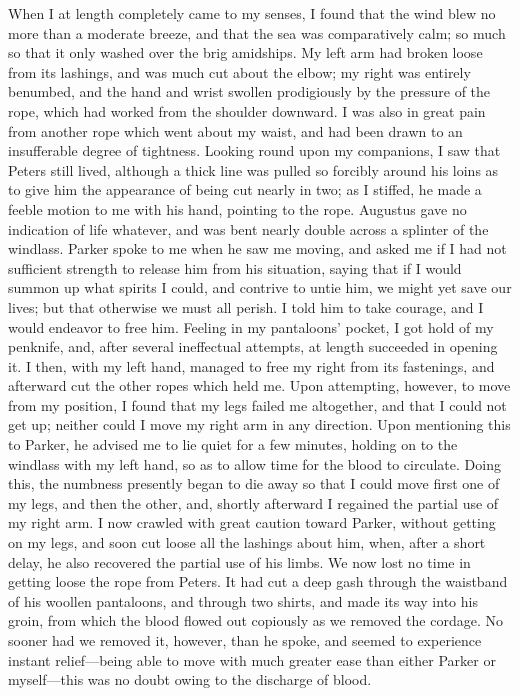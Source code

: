 When I at length completely came to my senses, I found that the wind blew no
more than a moderate breeze, and that the sea was comparatively calm; so much so
that it only washed over the brig amidships. My left arm had broken loose from
its lashings, and was much cut about the elbow; my right was entirely benumbed,
and the hand and wrist swollen prodigiously by the pressure of the rope, which
had worked from the shoulder downward. I was also in great pain from another
rope which went about my waist, and had been drawn to an insufferable degree of
tightness. Looking round upon my companions, I saw that Peters still lived,
although a thick line was pulled so forcibly around his loins as to give him the
appearance of being cut nearly in two; as I stiffed, he made a feeble motion to
me with his hand, pointing to the rope. Augustus gave no indication of life
whatever, and was bent nearly double across a splinter of the windlass. Parker
spoke to me when he saw me moving, and asked me if I had not sufficient strength
to release him from his situation, saying that if I would summon up what spirits
I could, and contrive to untie him, we might yet save our lives; but that
otherwise we must all perish. I told him to take courage, and I would endeavor
to free him. Feeling in my pantaloons' pocket, I got hold of my penknife, and,
after several ineffectual attempts, at length succeeded in opening it. I then,
with my left hand, managed to free my right from its fastenings, and afterward
cut the other ropes which held me. Upon attempting, however, to move from my
position, I found that my legs failed me altogether, and that I could not get
up; neither could I move my right arm in any direction. Upon mentioning this to
Parker, he advised me to lie quiet for a few minutes, holding on to the windlass
with my left hand, so as to allow time for the blood to circulate. Doing this,
the numbness presently began to die away so that I could move first one of my
legs, and then the other, and, shortly afterward I regained the partial use of
my right arm. I now crawled with great caution toward Parker, without getting on
my legs, and soon cut loose all the lashings about him, when, after a short
delay, he also recovered the partial use of his limbs. We now lost no time in
getting loose the rope from Peters. It had cut a deep gash through the waistband
of his woollen pantaloons, and through two shirts, and made its way into his
groin, from which the blood flowed out copiously as we removed the cordage. No
sooner had we removed it, however, than he spoke, and seemed to experience
instant relief---being able to move with much greater ease than either Parker or
myself---this was no doubt owing to the discharge of blood. 


